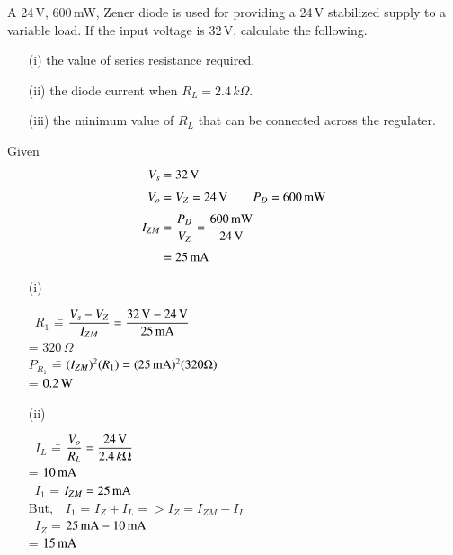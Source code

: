 \begin{example}\label{exam2.30}
A 24\,V, 600\,mW, Zener diode is used for providing a 24\,V stabilized supply to a variable load. If the input voltage is 32\,V, calculate the following.
\begin{itemize}
\item[(i)] the value of series resistance required.

\item[(ii)] the diode current when $R_{L}=2.4\,k\Omega$.

\item[(iii)] the minimum value of $R_{L}$ that can be connected across the regulater.
\end{itemize}
\end{example}

\begin{solution}
Given
\begin{align*}
V_{s} &= 32\text{\,V}\\[3pt]
V_{o} &= V_{Z}=24\text{\,V}\qquad P_{D}=600\text{\,mW}\\[3pt]
I_{ZM} &= \frac{P_{D}}{V_{Z}}=\frac{600\,\text{mW}}{24\text{\,V}}\\[3pt]
&= 25\text{\,mA}
\end{align*}
\begin{itemize}
\item[(i)]
\begin{tabbing}
~$R_{1}$ \== $\dfrac{V_{s}-V_{Z}}{I_{ZM}}=\dfrac{32\text{\,V}-24\text{\,V}}{25\text{\,mA}}$\\[6pt]
\>= $320\,\Omega$\\[6pt]
$P_{R_{1}}$ \== $(I_{ZM})^{2}(R_{1})=(25\text{\,mA})^{2}(320\Omega)$\\[6pt]
\>= $0.2\text{\,W}$
\end{tabbing}

\item[(ii)] 
\begin{tabbing}
\qquad~$I_{L}$ \== $\dfrac{V_{o}}{R_{L}}=\dfrac{24\text{\,V}}{2.4\,k\Omega}$\\[6pt]
        \>= $10\text{\,mA}$\\[6pt]
\qquad~$I_{1}$ \>= $I_{ZM}=25\text{\,mA}$\\[6pt]
But, \ \,$I_{1}$ \>= $I_{Z}+I_{L}=> I_{Z}=I_{ZM}-I_{L}$\\[6pt]
\qquad~$I_{Z}$ \>= $25\text{\,mA}-10\text{\,mA}$\\[6pt]
               \>= $15\text{\,mA}$
\end{tabbing}


\end{itemize}
\end{solution}
